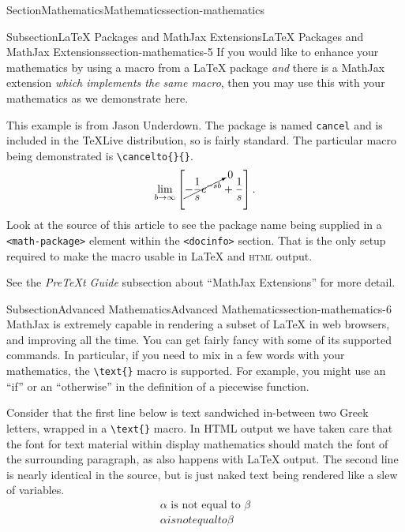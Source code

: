 \documentclass[twoside,10pt,]{article}
\newcommand{\mono}[1]{\texttt{#1}}
\newcommand{\initialism}[1]{\textsc{\MakeLowercase{#1}}}
\newcommand{\pubtitle}[1]{\textsl{#1}}
\numberwithin{equation}{section}
\begin{document}
\begin{sectionptx}{Section}{Mathematics}{}{Mathematics}{}{}{section-mathematics}
\begin{subsectionptx}{Subsection}{\LaTeX{} Packages and MathJax Extensions}{}{\LaTeX{} Packages and MathJax Extensions}{}{}{section-mathematics-5}
If you would like to enhance your mathematics by using a macro from a \LaTeX{} package \emph{and} there is a MathJax extension \emph{which implements the same macro}, then you may use this with your mathematics as we demonstrate here.%
\par
This example is from Jason Underdown.  The package is named \mono{cancel} and is included in the TeXLive distribution, so is fairly standard.  The particular macro being demonstrated is \mono{\textbackslash{}cancelto\{\}\{\}}.%
\begin{equation*}
\lim_{b \rightarrow \infty}\left[\cancelto{0}{-\frac{1}{s}e^{-sb}} + \frac{1}{s}\right]\text{.}
\end{equation*}
Look at the source of this article to see the package name being supplied in a \mono{<math-package>} element within the \mono{<docinfo>} section.  That is the only setup required to make the macro usable in \LaTeX{} and \initialism{HTML} output.\index{cancelto macro@\mono{cancelto} macro}%
\par
See the \pubtitle{PreTeXt Guide} subsection about ``MathJax Extensions'' for more detail.%
\end{subsectionptx}
%
%
\typeout{************************************************}
\typeout{************************************************}
%
\begin{subsectionptx}{Subsection}{Advanced Mathematics}{}{Advanced Mathematics}{}{}{section-mathematics-6}
MathJax is extremely capable in rendering a subset of \LaTeX{} in web browsers, and improving all the time.  You can get fairly fancy with some of its supported commands.  In particular, if you need to mix in a few words with your mathematics, the \mono{\textbackslash{}text\{\}} macro is supported.  For example, you might use an ``if'' or an ``otherwise'' in the definition of a piecewise function.%
\par
Consider that the first line below is text sandwiched in-between two Greek letters, wrapped in a \mono{\textbackslash{}text\{\}} macro.  In HTML output we have taken care that the font for text material within display mathematics should match the font of the  surrounding paragraph, as also happens with \LaTeX{} output.  The second line is nearly identical in the source, but is just naked text being rendered like a slew of variables.%
\begin{gather*}
\alpha\text{ is not equal to }\beta\\
\alpha is not equal to \beta\\

\end{gather*}
\end{subsectionptx}
\end{sectionptx}
\end{document}
